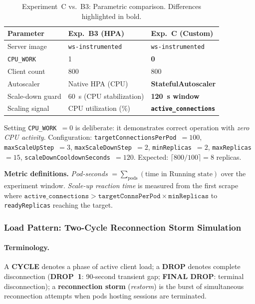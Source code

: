 \documentclass[3p,twocolumn]{elsarticle}
\theoremstyle{plain}%
\theoremstyle{definition}%
\begin{document}
\begin{table}[t]
\centering
\caption{Experiment~C vs.\ B3: Parametric comparison. Differences highlighted in bold.}
\label{tab:exp_c_setup}
\begin{tabular}{@{}lll@{}}
\toprule
\rowcolor{gray!12}
\textbf{Parameter} & \textbf{Exp.~B3 (HPA)} & \textbf{Exp.~C (Custom)} \\
\midrule
Server image & \texttt{ws-instrumented} & \texttt{ws-instrumented} \\
\texttt{CPU\_WORK} & 1 & \textbf{0} \\
Client count & 800 & 800 \\
Autoscaler & Native HPA (CPU) & \textbf{StatefulAutoscaler} \\
Scale-down guard & 60~s (CPU stabilization) & \textbf{120~s window} \\
Scaling signal & CPU utilization (\%) & \textbf{\texttt{active\_connections}} \\
\bottomrule
\end{tabular}
\end{table}

Setting \texttt{CPU\_WORK}~$= 0$ is deliberate: it demonstrates correct operation with \textit{zero CPU activity}. Configuration: \texttt{targetConnectionsPerPod}~$= 100$, \texttt{maxScaleUpStep}~$= 3$, \texttt{maxScaleDownStep}~$= 2$, \texttt{minReplicas}~$= 2$, \texttt{maxReplicas}~$= 15$, \texttt{scaleDownCooldownSeconds}~$= 120$. Expected: $\lceil 800/100 \rceil = 8$ replicas.

\textbf{Metric definitions.} \textit{Pod-seconds} $= \sum_{\text{pods}} (\text{time in Running state})$ over the experiment window. \textit{Scale-up reaction time} is measured from the first scrape where $\texttt{active\_connections} > \texttt{targetConnsPerPod} \times \texttt{minReplicas}$ to \texttt{readyReplicas} reaching the target.

\subsubsection{Load Pattern: Two-Cycle Reconnection Storm Simulation}

\paragraph{Terminology.} A \textbf{CYCLE} denotes a phase of active client load; a \textbf{DROP} denotes complete disconnection (\textbf{DROP~1}: 90-second transient gap; \textbf{FINAL DROP}: terminal disconnection); a \textbf{reconnection storm} (\textit{restorm}) is the burst of simultaneous reconnection attempts when pods hosting sessions are terminated.
\end{document}
